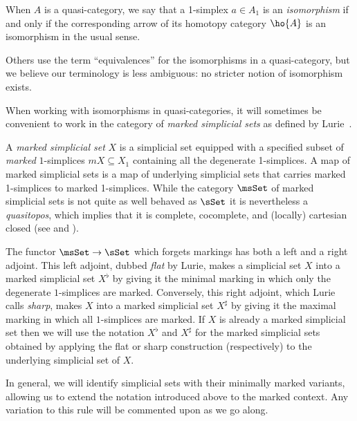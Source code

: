   \begin{defn}\label{defn:equivalences} 
    When $A$ is a quasi-category, we say that a 1-simplex $a\in A_1$ is an {\em isomorphism\/} if and only if the corresponding arrow of its homotopy category $\ho{A}$ is an isomorphism in the usual sense.
\end{defn}

Others use the term ``equivalences'' for the isomorphisms in a quasi-category, but we believe our terminology is less ambiguous: no stricter notion of isomorphism exists. 

When working with isomorphisms in quasi-categories, it will sometimes be convenient to work in the category of {\em marked simplicial sets\/} as defined by Lurie~\cite{Lurie:2009fk}.

    \begin{defn}
      A {\em marked simplicial set} $X$ is a simplicial set equipped with a specified subset of \emph{marked} $1$-simplices $mX\subseteq X_1$ containing all the degenerate 1-simplices. A map of marked simplicial sets is a map of underlying simplicial sets that carries marked 1-simplices to marked 1-simplices. While the category $\msSet$ of marked simplicial sets is not quite as well behaved as $\sSet$ it is nevertheless a \emph{quasitopos}, which implies that it is complete, cocomplete, and (locally) cartesian closed (see \cite[Observation 11]{Verity:2007:wcs1} and \cite{Street:2003:WomCats}).

      The functor $\msSet\to\sSet$ which forgets markings has both a left and a right adjoint. This left adjoint, dubbed {\em flat\/} by Lurie, makes a simplicial set $X$ into a marked simplicial set $X^\flat$ by giving it the minimal marking in which only the degenerate $1$-simplices are marked. Conversely, this right adjoint, which Lurie calls {\em sharp}, makes $X$ into a marked simplicial set $X^\sharp$ by giving it the maximal marking in which all $1$-simplices are marked. If $X$ is already a marked simplicial set then we will use the notation $X^\flat$ and $X^\sharp$ for the marked simplicial sets obtained by applying the flat or sharp construction (respectively) to the underlying simplicial set of $X$.

      In general, we will identify simplicial sets with their minimally marked variants, allowing us to extend the notation introduced above to the marked context. Any variation to this rule will be commented upon as we go along.
    \end{defn}
    
